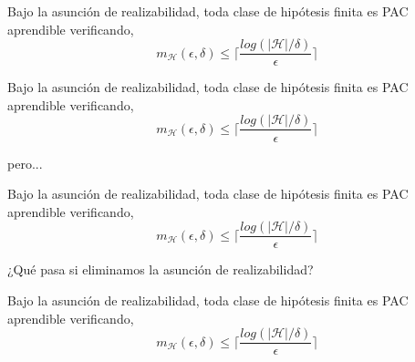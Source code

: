 \begin{frame}

    \begin{overprint} %
        
            \begin{proposition}
            Bajo la asunción de realizabilidad, toda clase de hipótesis finita es PAC aprendible verificando, 
                \begin{equation*}
                    m_{\mathcal{H}} (\epsilon, \delta) \leq \lceil \frac{log(|\mathcal{H}|/\delta)}{\epsilon} \rceil
                \end{equation*}
            \end{proposition}
            \begin{proposition}
            Bajo la asunción de realizabilidad, toda clase de hipótesis finita es PAC aprendible verificando, 
                \begin{equation*}
                    m_{\mathcal{H}} (\epsilon, \delta) \leq \lceil \frac{log(|\mathcal{H}|/\delta)}{\epsilon} \rceil
                \end{equation*}
            \end{proposition}
            pero...
            \begin{proposition}
            Bajo la asunción de realizabilidad, toda clase de hipótesis finita es PAC aprendible verificando, 
                \begin{equation*}
                    m_{\mathcal{H}} (\epsilon, \delta) \leq \lceil \frac{log(|\mathcal{H}|/\delta)}{\epsilon} \rceil
                \end{equation*}
            \end{proposition}
            ¿Qué pasa si eliminamos la asunción de realizabilidad?
            \begin{proposition}
            Bajo la asunción de realizabilidad, toda clase de hipótesis finita es PAC aprendible verificando, 
                \begin{equation*}
                    m_{\mathcal{H}} (\epsilon, \delta) \leq \lceil \frac{log(|\mathcal{H}|/\delta)}{\epsilon} \rceil
                \end{equation*}
            \end{proposition}
            

\end{overprint}
\end{frame}
